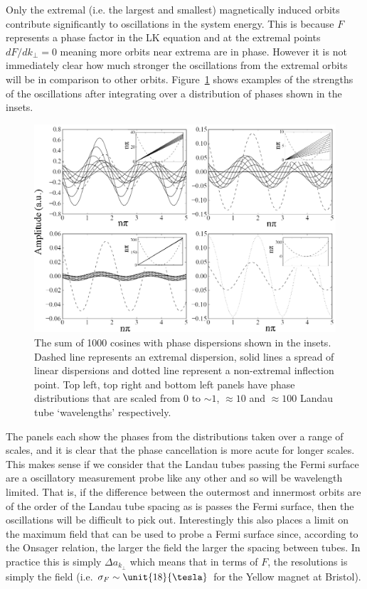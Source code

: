Only the extremal (i.e. the largest and smallest) magnetically induced orbits contribute significantly to oscillations in the system energy. This is because $F$ represents a phase factor in the \ac{LK} equation and at the extremal points $dF/dk_\perp=0$ meaning more orbits near extrema are in phase. However it is not immediately clear how much stronger the oscillations from the extremal orbits will be in comparison to other orbits. Figure~\ref{Fig:Theo:ExtremalPhases} shows examples of the strengths of the oscillations after integrating over a distribution of phases shown in the insets.
\begin{figure}[htbp]
    \begin{center}
        \includegraphics[scale=0.8]{Chapter-Theory/Figures/ExtremalPhases/ExtremalPhases}
        \caption{The sum of 1000 cosines with phase dispersions shown in the insets. Dashed line represents an extremal dispersion, solid lines a spread of linear dispersions and dotted line represent a non-extremal inflection point. Top left, top right and bottom left panels have phase distributions that are scaled from $0$ to $\sim1$, $\approx10$ and $\approx100$ Landau tube `wavelengths' respectively.}
        \label{Fig:Theo:ExtremalPhases}
    \end{center}
\end{figure}
The panels each show the phases from the distributions taken over a range of scales, and it is clear that the phase cancellation is more acute for longer scales. This makes sense if we consider that the Landau tubes passing the Fermi surface are a oscillatory measurement probe like any other and so will be wavelength limited. That is, if the difference between the outermost and innermost orbits are of the order of the Landau tube spacing as is passes the Fermi surface, then the oscillations will be difficult to pick out. Interestingly this also places a limit on the maximum field that can be used to probe a Fermi surface since, according to the Onsager relation, the larger the field the larger the spacing between tubes. In practice this is simply $\Delta a_{k_\perp}$ which means that in terms of $F$, the resolutions is simply the field (i.e. $\sigma_F \sim \unit{18}{\tesla}$ for the Yellow magnet at Bristol). 

